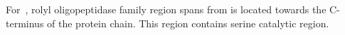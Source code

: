 For~, rolyl oligopeptidase family region spans from is located towards the C-terminus of the protein chain. This region contains serine catalytic region.  